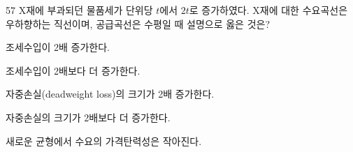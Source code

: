 \begin{question}{57}
X재에 부과되던 물품세가 단위당 $t$에서 $2t$로 증가하였다. X재에 대한 수요곡선은 우하향하는 직선이며, 공급곡선은 수평일 때 설명으로 옳은 것은?
\begin{choices}
  \item 조세수입이 2배 증가한다.
  \item 조세수입이 2배보다 더 증가한다.
  \item 자중손실(deadweight loss)의 크기가 2배 증가한다.
  \item 자중손실의 크기가 2배보다 더 증가한다.
  \item 새로운 균형에서 수요의 가격탄력성은 작아진다.
\end{choices}
\end{question}
